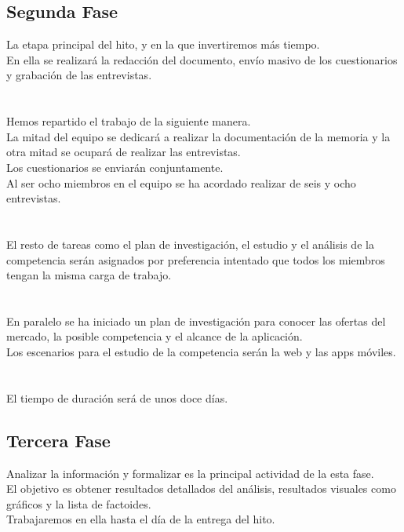 \documentclass[12pt]{article}
\begin{document}
\subsection{Segunda Fase}
La etapa principal del hito, y en la que invertiremos más tiempo.\\ En ella se realizará la redacción del documento, envío masivo de los cuestionarios y grabación de las entrevistas.\\
\\
\\
Hemos repartido el trabajo de la siguiente manera.\\ La mitad del equipo se dedicará a realizar la documentación de la memoria y la otra mitad se ocupará de realizar las entrevistas.\\ Los cuestionarios se enviarán conjuntamente.\\ Al ser ocho miembros en el equipo se ha acordado realizar de seis y ocho entrevistas.\\
\\
\\
El resto de tareas como el plan de investigación, el estudio y el análisis de la competencia serán asignados por preferencia intentado que todos los miembros tengan la misma carga de trabajo.\\
\\
\\
En paralelo se ha iniciado un plan de investigación para conocer las ofertas del mercado, la posible competencia y el alcance de la aplicación.\\ Los escenarios para el estudio de la competencia serán la web y las apps móviles.\\
\\
\\
El tiempo de duración será de unos doce días.\\
\subsection{Tercera Fase}
Analizar la información y formalizar es la principal actividad de la esta fase.\\ El objetivo es obtener resultados detallados del análisis, resultados visuales como gráficos y la lista de factoides.\\ Trabajaremos en ella hasta el día de la entrega del hito.\\
\end{document}
